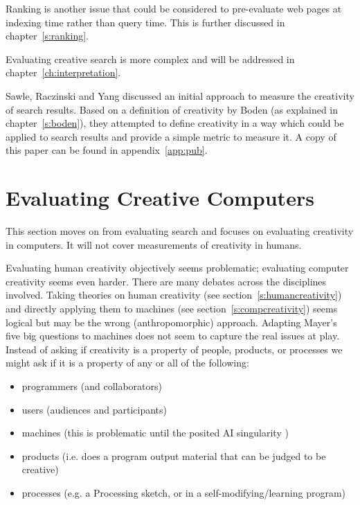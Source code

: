 Ranking is another issue that could be considered to pre-evaluate web pages at indexing time rather than query time. This is further discussed in chapter~\ref{s:ranking}.

\spirals

Evaluating creative search is more complex and will be addressed in chapter~\ref{ch:interpretation}. 

Sawle, Raczinski and Yang \citeyear{Sawle2011} discussed an initial approach to measure the creativity of search results. Based on a definition of creativity by Boden (as explained in chapter~\ref{s:boden}), they attempted to define creativity in a way which could be applied to search results and provide a simple metric to measure it. A copy of this paper can be found in appendix~\ref{app:pub}.


\section{Evaluating Creative Computers}
\label{s:creattributes}

This section moves on from evaluating search and focuses on evaluating creativity in computers. It will not cover measurements of creativity in humans. 

Evaluating human creativity objectively seems problematic; evaluating computer creativity seems even harder. There are many debates across the disciplines involved. Taking theories on human creativity (see section~\ref{s:humancreativity}) and directly applying them to machines (see section~\ref{s:compcreativity}) seems logical but may be the wrong (anthropomorphic) approach. Adapting Mayer's five big questions \citeyear{Mayer1999} to machines does not seem to capture the real issues at play. Instead of asking if creativity is a property of people, products, or processes we might ask if it is a property of any or all of the following:

\begin{itemize}
  \item programmers (and collaborators)
  \item users (audiences and participants)
  \item machines (this is problematic until the posited AI singularity \cite{Schmidhuber2006a})
  \item products (i.e. does a program output material that can be judged to be creative)
  \item processes (e.g. a Processing sketch, or in a self-modifying/learning program)
\end{itemize}

